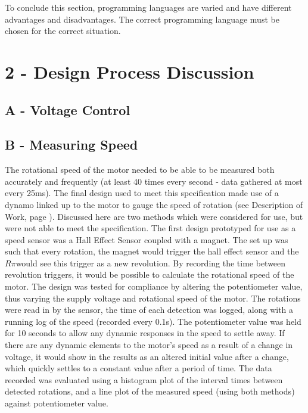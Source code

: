 \documentclass[twoside,a4]{report}
\def\br{\newline \newline \noindent}
\def\rpi{\(R\pi\)}
\begin{document}
	To conclude this section,  programming languages are varied and have different advantages and disadvantages. The correct programming language must be chosen for the correct situation.\newline \newline  \noindent

\section{2 - Design Process Discussion}
\subsection{A - Voltage Control}
\subsection{B - Measuring Speed}
The rotational speed of the motor needed to be able to be measured both accurately and frequently (at least 40 times every second - data gathered at most every 25ms). The final design used to meet this specification made use of a dynamo linked up to the motor to gauge the speed of rotation (see Description of Work, page \pageref{chap:dow}). Discussed here are two methods which were considered for use, but were not able to meet the specification.\br 
The first design prototyped for use as a speed sensor was a Hall Effect Sensor coupled with a magnet. The set up was such that every rotation, the magnet would trigger the hall effect sensor and the \rpi would see this trigger as a new revolution. By recording the time between revolution triggers, it would be possible to calculate the rotational speed of the motor. The design was tested for compliance by altering the potentiometer value, thus varying the supply voltage and rotational speed of the motor. The rotations were read in by the sensor, the time of each detection was logged, along with a running log of the speed (recorded every 0.1s). The potentiometer value was held for 10 seconds to allow any dynamic responses in the speed to settle away. If there are any dynamic elements to the motor's speed as a result of a change in voltage, it would show in the results as an altered initial value after a change, which quickly settles to a constant value after  a period of time. The data recorded was evaluated using a histogram plot of the interval times between detected rotations, and a line plot of the measured speed (using both methods) against potentiometer value. \newline \newline \noindent
\end{document}
